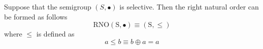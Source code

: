 Suppose that the semigroup $(S , \bullet)$ is selective. Then the right natural order can be formed as follows
\begin{equation*}
\mathrm{RNO(S, \bullet)} \equiv \mathrm{(S , \leq)}
\end{equation*}
where $\leq$ is defined as
\begin{equation*}
a \leq b \equiv b \oplus a = a
\end{equation*}

